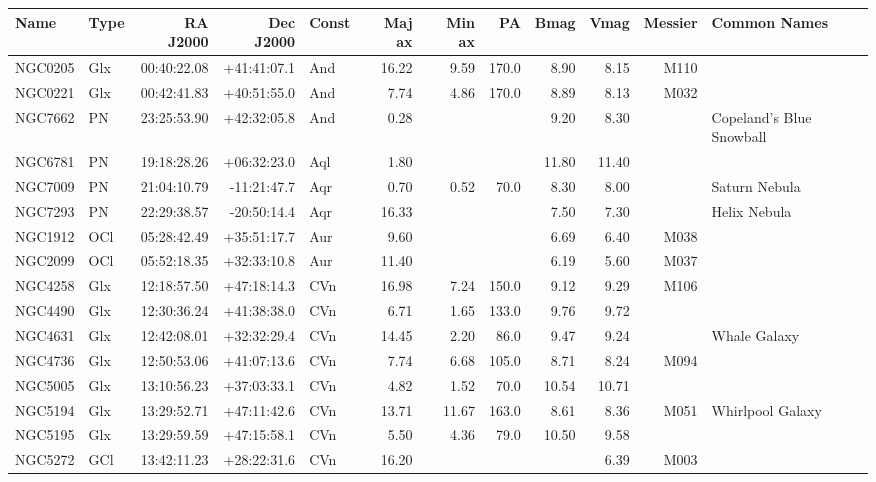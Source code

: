 \documentclass[11pt]{article}
\begin{document}
\begin{longtable}{llrrlrrrrrrl}
\toprule
  Name & Type & RA J2000 & Dec J2000 & Const & Maj ax & Min ax & PA & Bmag & Vmag  & Messier & Common Names \\
\midrule \endhead
  NGC0205 & Glx     & 00:40:22.08 & +41:41:07.1 & And & 16.22  & 9.59   & 170.0 & 8.90  & 8.15   & M110 & \\
  NGC0221 & Glx     & 00:42:41.83 & +40:51:55.0 & And & 7.74   & 4.86   & 170.0 & 8.89  & 8.13   & M032 & \\
  NGC7662 & PN      & 23:25:53.90 & +42:32:05.8 & And & 0.28   &        &       & 9.20  & 8.30   &      & Copeland's Blue Snowball \\
  NGC6781 & PN      & 19:18:28.26 & +06:32:23.0 & Aql & 1.80   &        &       & 11.80 & 11.40  &      & \\
  NGC7009 & PN      & 21:04:10.79 & -11:21:47.7 & Aqr & 0.70   & 0.52   & 70.0  & 8.30  & 8.00   &      & Saturn Nebula \\
  NGC7293 & PN      & 22:29:38.57 & -20:50:14.4 & Aqr & 16.33  &        &       & 7.50  & 7.30   &      & Helix Nebula \\
  NGC1912 & OCl     & 05:28:42.49 & +35:51:17.7 & Aur & 9.60   &        &       & 6.69  & 6.40   & M038 & \\
  NGC2099 & OCl     & 05:52:18.35 & +32:33:10.8 & Aur & 11.40  &        &       & 6.19  & 5.60   & M037 & \\
  NGC4258 & Glx     & 12:18:57.50 & +47:18:14.3 & CVn & 16.98  & 7.24   & 150.0 & 9.12  & 9.29   & M106 & \\
  NGC4490 & Glx     & 12:30:36.24 & +41:38:38.0 & CVn & 6.71   & 1.65   & 133.0 & 9.76  & 9.72   &      & \\
  NGC4631 & Glx     & 12:42:08.01 & +32:32:29.4 & CVn & 14.45  & 2.20   & 86.0  & 9.47  & 9.24   &      & Whale Galaxy \\
  NGC4736 & Glx     & 12:50:53.06 & +41:07:13.6 & CVn & 7.74   & 6.68   & 105.0 & 8.71  & 8.24   & M094 & \\
  NGC5005 & Glx     & 13:10:56.23 & +37:03:33.1 & CVn & 4.82   & 1.52   & 70.0  & 10.54 & 10.71  &      & \\
  NGC5194 & Glx     & 13:29:52.71 & +47:11:42.6 & CVn & 13.71  & 11.67  & 163.0 & 8.61  & 8.36   & M051 & Whirlpool Galaxy \\
  NGC5195 & Glx     & 13:29:59.59 & +47:15:58.1 & CVn & 5.50   & 4.36   & 79.0  & 10.50 & 9.58   &      & \\
  NGC5272 & GCl     & 13:42:11.23 & +28:22:31.6 & CVn & 16.20  &        &       &       & 6.39   & M003 & \\

\end{longtable}
\end{document}

